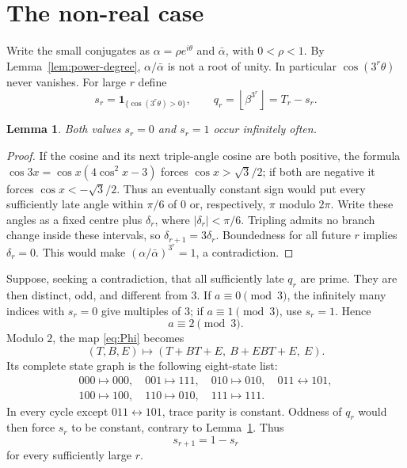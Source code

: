 \documentclass[11pt,a4paper]{article}
\newtheorem{lemma}[theorem]{Lemma}
\theoremstyle{definition}\newtheorem{definition}[theorem]{Definition}
\theoremstyle{remark}\newtheorem{remark}[theorem]{Remark}
\newcommand{\floor}[1]{\left\lfloor #1\right\rfloor}\newcommand{\ceil}[1]{\left\lceil #1\right\rceil}
\begin{document}
\section{The non-real case}
Write the small conjugates as $\alpha=\rho e^{i\theta}$ and $\bar\alpha$, with $0<\rho<1$. By Lemma~\ref{lem:power-degree}, $\alpha/\bar\alpha$ is not a root of unity. In particular $\cos(3^r\theta)$ never vanishes. For large $r$ define
\[
 s_r=\mathbf1_{\{\cos(3^r\theta)>0\}},\qquad
 q_r=\floor{\beta^{3^r}}=T_r-s_r.
\]
\begin{lemma}\label{lem:both-signs}
Both values $s_r=0$ and $s_r=1$ occur infinitely often.
\end{lemma}
\begin{proof}
If the cosine and its next triple-angle cosine are both positive, the formula
$\cos3x=\cos x(4\cos^2x-3)$ forces $\cos x>\sqrt3/2$; if both are negative it forces $\cos x<-\sqrt3/2$. Thus an eventually constant sign would put every sufficiently late angle within $\pi/6$ of $0$ or, respectively, $\pi$ modulo $2\pi$. Write these angles as a fixed centre plus $\delta_r$, where $|\delta_r|<\pi/6$. Tripling admits no branch change inside these intervals, so $\delta_{r+1}=3\delta_r$. Boundedness for all future $r$ implies $\delta_r=0$. This would make $(\alpha/\bar\alpha)^{3^r}=1$, a contradiction.
\end{proof}
Suppose, seeking a contradiction, that all sufficiently late $q_r$ are prime. They are then distinct, odd, and different from $3$. If $a\equiv0\pmod3$, the infinitely many indices with $s_r=0$ give multiples of $3$; if $a\equiv1\pmod3$, use $s_r=1$. Hence
\begin{equation}\label{eq:a2}
 a\equiv2\pmod3.
\end{equation}
Modulo $2$, the map \eqref{eq:Phi} becomes
\[
 (T,B,E)\longmapsto(T+BT+E,\ B+EBT+E,\ E).
\]
Its complete state graph is the following eight-state list:
\[
\begin{gathered}
000\mapsto000,\quad001\mapsto111,\quad010\mapsto010,\quad
011\leftrightarrow101,\\
100\mapsto100,\quad110\mapsto010,\quad111\mapsto111.
\end{gathered}
\]
In every cycle except $011\leftrightarrow101$, trace parity is constant. Oddness of $q_r$ would then force $s_r$ to be constant, contrary to Lemma~\ref{lem:both-signs}. Thus
\begin{equation}\label{eq:alternating}
 s_{r+1}=1-s_r
\end{equation}
for every sufficiently large $r$.
\end{document}
